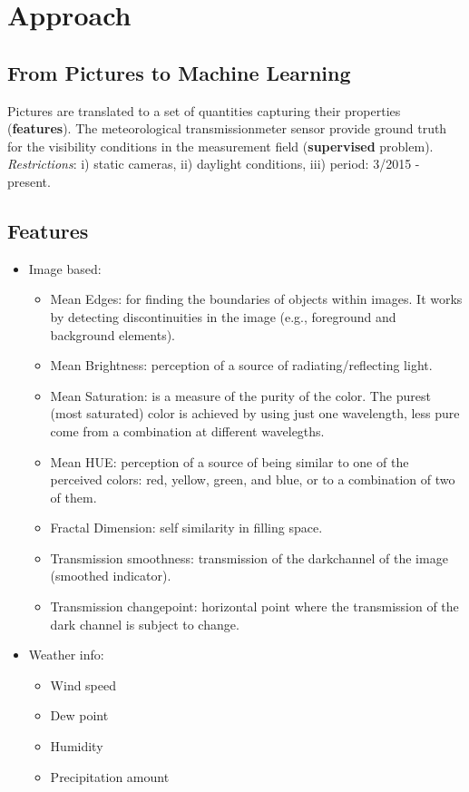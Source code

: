 \documentclass{article}
\begin{document}
\section*{Approach}
\subsection*{From Pictures to Machine Learning}
Pictures are translated to a set of quantities capturing their properties (\textbf{features}).\newline
The meteorological transmissionmeter sensor provide ground truth for the visibility conditions in the measurement field (\textbf{supervised} problem).
\textit{Restrictions}: i) static cameras, ii) daylight conditions, iii) period: 3/2015 - present.

\subsection*{Features}
\begin{itemize}
\item{Image based:}
\begin{itemize}
\item{Mean Edges: for finding the boundaries of objects within images. It works by detecting discontinuities in the image (e.g., foreground and background elements).}
\item{Mean Brightness: perception of a source of radiating/reflecting light.}
\item{Mean Saturation: is a measure of the purity of the color. The purest (most saturated) color is achieved by using just one wavelength, less pure come from a combination at different wavelegths.}
\item{Mean HUE: perception of a source of being similar to one of the perceived colors: red, yellow, green, and blue, or to a combination of two of them.}
\item{Fractal Dimension: self similarity in filling space.}
\item{Transmission smoothness: transmission of the darkchannel of the image (smoothed indicator).}
\item{Transmission changepoint: horizontal point where the transmission of the dark channel is subject to change.}
\end{itemize}
\item{Weather info:}
\begin{itemize}
\item{Wind speed}
\item{Dew point}
\item{Humidity}
\item{Precipitation amount}
\end{itemize}
\end{itemize}
\end{document}

